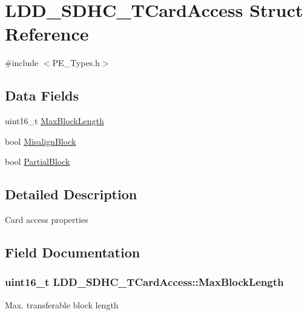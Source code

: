 \hypertarget{struct_l_d_d___s_d_h_c___t_card_access}{}\section{L\+D\+D\+\_\+\+S\+D\+H\+C\+\_\+\+T\+Card\+Access Struct Reference}
\label{struct_l_d_d___s_d_h_c___t_card_access}


{\ttfamily \#include $<$P\+E\+\_\+\+Types.\+h$>$}

\subsection*{Data Fields}
\begin{DoxyCompactItemize}
\item 
uint16\+\_\+t \hyperlink{struct_l_d_d___s_d_h_c___t_card_access_aeeba296e7a8dc6164c925b816416ef2e}{Max\+Block\+Length}
\item 
bool \hyperlink{struct_l_d_d___s_d_h_c___t_card_access_aa56e65353fd03ffdbd8cc8d19537b621}{Misalign\+Block}
\item 
bool \hyperlink{struct_l_d_d___s_d_h_c___t_card_access_a9d78668915e934548a04351b20ec2d0a}{Partial\+Block}
\end{DoxyCompactItemize}


\subsection{Detailed Description}
Card access properties 

\subsection{Field Documentation}
\hypertarget{struct_l_d_d___s_d_h_c___t_card_access_aeeba296e7a8dc6164c925b816416ef2e}{}
\subsubsection[{Max\+Block\+Length}]{\setlength{\rightskip}{0pt plus 5cm}uint16\+\_\+t L\+D\+D\+\_\+\+S\+D\+H\+C\+\_\+\+T\+Card\+Access\+::\+Max\+Block\+Length}\label{struct_l_d_d___s_d_h_c___t_card_access_aeeba296e7a8dc6164c925b816416ef2e}
Max. transferable block length \hypertarget{struct_l_d_d___s_d_h_c___t_card_access_aa56e65353fd03ffdbd8cc8d19537b621}{}
